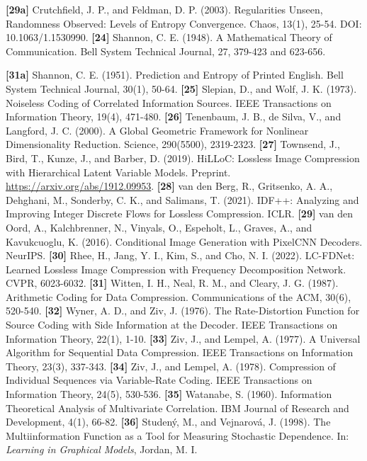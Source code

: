\documentclass[
]{article}
\begin{document}
\textbf{{[}29a{]}} Crutchfield, J. P., and Feldman, D. P. (2003).
Regularities Unseen, Randomness Observed: Levels of Entropy
Convergence. Chaos, 13(1), 25-54. DOI: 10.1063/1.1530990.
\textbf{{[}24{]}} Shannon, C. E. (1948). A Mathematical Theory of
Communication. Bell System Technical Journal, 27, 379-423 and 623-656.

\textbf{{[}31a{]}} Shannon, C. E. (1951). Prediction and Entropy of
Printed English. Bell System Technical Journal, 30(1), 50-64.
\textbf{{[}25{]}} Slepian, D., and Wolf, J. K. (1973). Noiseless Coding
of Correlated Information Sources. IEEE Transactions on Information
Theory, 19(4), 471-480.
\textbf{{[}26{]}} Tenenbaum, J. B., de Silva, V., and Langford, J. C.
(2000). A Global Geometric Framework for Nonlinear Dimensionality
Reduction. Science, 290(5500), 2319-2323.
\textbf{{[}27{]}} Townsend, J., Bird, T.,
Kunze, J., and Barber, D. (2019). HiLLoC: Lossless Image Compression with
Hierarchical Latent Variable Models. Preprint.
\url{https://arxiv.org/abs/1912.09953}.
\textbf{{[}28{]}} van den Berg, R., Gritsenko, A. A., Dehghani, M.,
Sonderby, C. K., and Salimans, T. (2021). IDF++: Analyzing and Improving
Integer Discrete Flows for Lossless Compression. ICLR.
\textbf{{[}29{]}} van den Oord, A., Kalchbrenner, N., Vinyals, O.,
Espeholt, L., Graves, A., and Kavukcuoglu, K. (2016). Conditional Image
Generation with PixelCNN Decoders. NeurIPS.
\textbf{{[}30{]}} Rhee, H., Jang, Y. I., Kim, S., and Cho, N. I. (2022).
LC-FDNet: Learned Lossless Image Compression with Frequency
Decomposition Network. CVPR, 6023-6032.
\textbf{{[}31{]}} Witten, I. H., Neal, R. M., and Cleary, J. G. (1987).
Arithmetic Coding for Data Compression. Communications of the ACM,
30(6), 520-540.
\textbf{{[}32{]}} Wyner, A. D., and Ziv, J. (1976). The Rate-Distortion
Function for Source Coding with Side Information at the Decoder. IEEE
Transactions on Information Theory, 22(1), 1-10.
\textbf{{[}33{]}} Ziv, J., and Lempel, A. (1977). A Universal Algorithm
for Sequential Data Compression. IEEE Transactions on Information
Theory, 23(3), 337-343.
\textbf{{[}34{]}} Ziv, J., and Lempel, A. (1978). Compression of
Individual Sequences via Variable-Rate Coding. IEEE Transactions on
Information Theory, 24(5), 530-536.
\textbf{{[}35{]}} Watanabe, S. (1960). Information Theoretical
Analysis of Multivariate Correlation. IBM Journal of Research and
Development, 4(1), 66-82.
\textbf{{[}36{]}} Studen\'y, M., and Vejnarov\'a, J. (1998). The
Multiinformation Function as a Tool for Measuring Stochastic
Dependence. In: \emph{Learning in Graphical Models}, Jordan, M. I.
\end{document}
